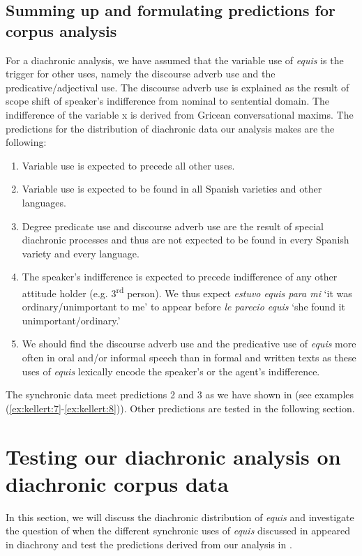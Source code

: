 \documentclass[output=paper]{langsci/langscibook}
\begin{document}
\subsection{Summing up and formulating predictions for corpus analysis}\label{sec:kellert:4.3}
For a diachronic analysis, we have assumed that the variable use of \textit{equis} is the trigger for other uses, namely the discourse adverb use and the predicative/adjectival use. The discourse adverb use is explained as the result of scope shift of speaker’s indifference from nominal to sentential domain. The indifference of the variable x is derived from Gricean conversational maxims. The predictions for the distribution of diachronic data our analysis makes are the following:

\begin{enumerate}
	\item Variable use is expected to precede all other uses.
	\item Variable use is expected to be found in all Spanish varieties and other languages.
	\item Degree predicate use and discourse adverb use are the result of special diachronic processes and thus are not expected to be found in every Spanish variety and every language.
	\item The speaker’s indifference is expected to precede indifference of any other attitude holder (e.g. 3\textsuperscript{rd} person). We thus expect \textit{estuvo equis para mi} ‘it was ordinary/unimportant to me’ to appear before \textit{le parecio equis} ‘she found it unimportant/ordinary.’
	\item We should find the discourse adverb use and the predicative use of \textit{equis} more often in oral and/or informal speech than in formal and written texts as these uses of \textit{equis} lexically encode the speaker’s or the agent’s indifference.
\end{enumerate}

The synchronic data meet predictions 2 and 3 as we have shown in  (see examples (\ref{ex:kellert:7}-\ref{ex:kellert:8})). Other predictions are tested in the following section.

\section{Testing our diachronic analysis on diachronic corpus data}\label{sec:kellert:5}
In this section, we will discuss the diachronic distribution of \textit{equis} and investigate the question of when the different synchronic uses of \textit{equis} discussed in  appeared in diachrony and test the predictions derived from our analysis in .
\end{document}
